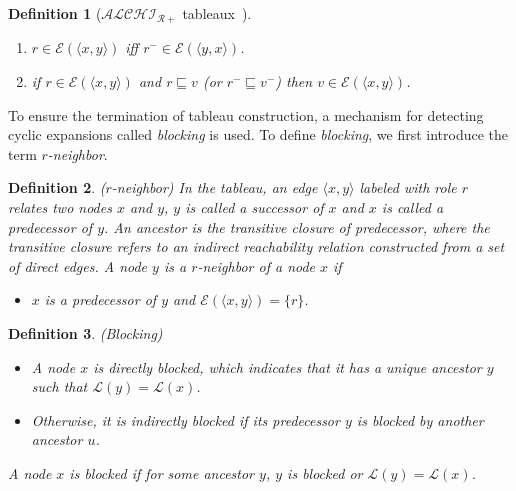 \documentclass{article}
\newtheorem{mydef}{Definition}
\begin{document}
\begin{mydef}[$\mathcal{ALCHI_{R+}}$ tableaux~\cite{horrocks1999description}]
\begin{enumerate}
{$\forall r\circ r.C\in \mathcal{L}(x)$. Therefore, for $x$ $r$-successor $y$, $\forall r.C\in \mathcal{L}(y)$.}, then $\forall r.C\in \mathcal{L}(y)$.
\item $r \in \mathcal{E}(\langle x,y\rangle)$ iff  $ r^-\in \mathcal{E}(\langle y,x\rangle)$.
\item if $ r\in \mathcal{E}(\langle x,y\rangle)$ and $r\sqsubseteq v$ (or $r^-\sqsubseteq v^-$) then  $v \in \mathcal{E}(\langle x,y\rangle)$.
\end{enumerate}

\end{mydef}



To ensure the termination of tableau construction, a mechanism for detecting cyclic expansions called \textit{blocking} is used.
To define \textit{blocking}, we first introduce the term \textit{$r$-neighbor}.
\begin{mydef}($r$-neighbor)
In the tableau, an edge $\langle x,y \rangle$ labeled with role $r$ relates two nodes $x$ and $y$,
$y$ is called a successor of $x$ and $x$ is called  a predecessor of $y$. An ancestor is the transitive closure of predecessor,
where the transitive closure refers to an indirect reachability relation constructed from a set of direct edges.
A node $y$ is a $r$-neighbor of a node $x$ if
\begin{itemize}
\item $x$ is a predecessor of $y$ and $\mathcal{E}(\langle x,y\rangle)=\{r\}$.
\end{itemize}
\end{mydef}


\begin{mydef}(Blocking)

\begin{itemize}
\item A node $x$ is directly blocked, which indicates that it has a unique ancestor $y$ such that $\mathcal{L}(y)=\mathcal{L}(x)$.
\item  Otherwise, it is indirectly blocked if its predecessor $y$ is blocked by another ancestor $u$.
\end{itemize}
A node $x$ is blocked if for some ancestor $y$, $y$ is blocked or $\mathcal{L}(y)=\mathcal{L}(x)$. 
\end{mydef}
\end{document}
